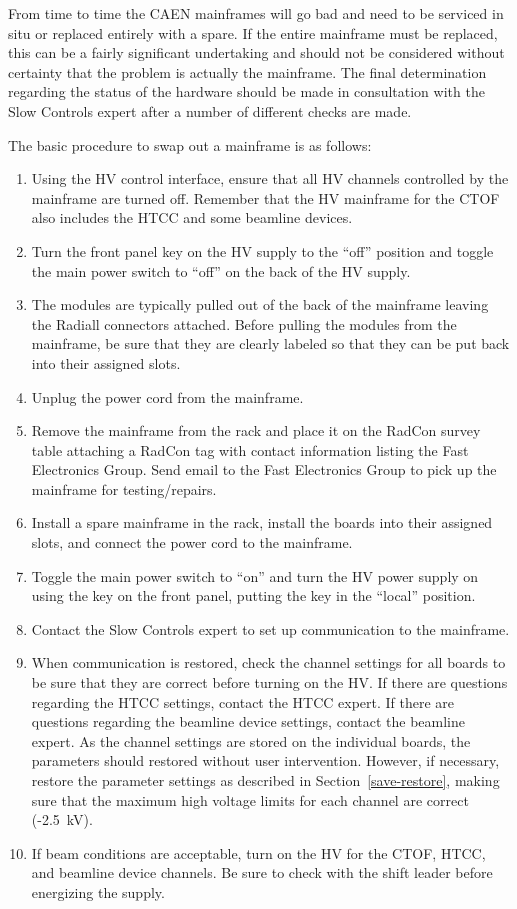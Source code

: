 \documentclass[12pt]{article}
\begin{document}
From time to time the CAEN mainframes will go bad and need to be serviced in situ or replaced entirely with a
spare. If the entire mainframe must be replaced, this can be a fairly significant undertaking and should not be
considered without certainty that the problem is actually the mainframe. The final determination regarding the
status of the hardware should be made in consultation with the Slow Controls expert after a number of different
checks are made.

The basic procedure to swap out a mainframe is as follows:

\begin{enumerate}
\item Using the HV control interface, ensure that all HV channels controlled by the mainframe are turned off.
Remember that the HV mainframe for the CTOF also includes the HTCC and some beamline devices.
\item Turn the front panel key on the HV supply to the ``off'' position and toggle the main power switch to
``off'' on the back of the HV supply.
\item The modules are typically pulled out of the back of the mainframe leaving the Radiall connectors attached.
Before pulling the modules from the mainframe, be sure that they are clearly labeled so that they can be put
back into their assigned slots.
\item Unplug the power cord from the mainframe.
\item Remove the mainframe from the rack and place it on the RadCon survey table attaching a RadCon tag with
contact information listing the Fast Electronics Group. Send email to the Fast Electronics Group to pick up the
mainframe for testing/repairs.
\item Install a spare mainframe in the rack, install the boards into their assigned slots, and connect the power
cord to the mainframe.
\item Toggle the main power switch to ``on'' and turn the HV power supply on using the key on the front panel,
putting the key in the ``local'' position.
\item Contact the Slow Controls expert to set up communication to the mainframe.
\item When communication is restored, check the channel settings for all boards to be sure that they are correct
before turning on the HV. If there are questions regarding the HTCC settings, contact the HTCC expert. If
there are questions regarding the beamline device settings, contact the beamline expert. As the channel
settings are stored on the individual boards, the parameters should restored without user intervention. However,
if necessary, restore the parameter settings as described in Section~\ref{save-restore}, making sure that the
maximum high voltage limits for each channel are correct (-2.5~kV).
\item If beam conditions are acceptable, turn on the HV for the CTOF, HTCC, and beamline device channels. Be
sure to check with the shift leader before energizing the supply.
\end{enumerate}
\end{document}
